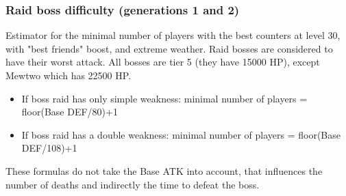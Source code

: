 \documentclass[12pt]{beamer}
\begin{document}
\begin{frame}
\begin{footnotesize}
\frametitle{Raid boss difficulty (generations 1 and 2)}

\begin{block}{}
Estimator for the minimal number of players with the best counters at level 30, with "best friends" boost, and extreme weather. Raid bosses are considered to have their worst attack. All bosses are tier 5 (they have 15000 HP), except Mewtwo which has 22500 HP.
\begin{itemize}
  \item If boss raid has only simple weakness: minimal number of players = floor(Base DEF/80)+1
  \item If boss raid has a double weakness: minimal number of players = floor(Base DEF/108)+1
\end{itemize}
These formulas do not take the Base ATK into account, that influences the number of deaths and indirectly the time to defeat the boss. 

\medskip


\end{block}
\end{footnotesize}
\end{frame}
\end{document}
